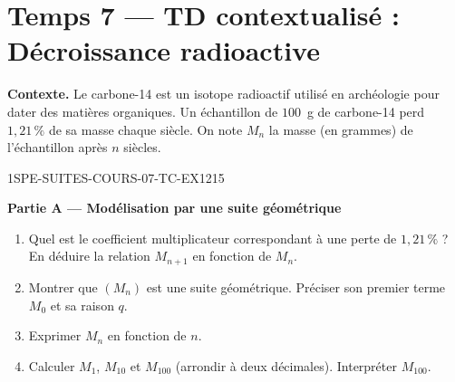 
\section*{Temps 7 — TD contextualisé : Décroissance radioactive}

\textbf{Contexte.} Le carbone-14 est un isotope radioactif utilisé en archéologie pour dater des matières organiques. Un échantillon de $100$~g de carbone-14 perd $1{,}21\,\%$ de sa masse chaque siècle. On note $M_n$ la masse (en grammes) de l'échantillon après $n$ siècles.

\bigskip


\begin{exercice}{1SPE-SUITES-COURS-07-TC-EX1}{2}{15}

\textbf{Partie A — Modélisation par une suite géométrique}

\begin{enumerate}
  \item Quel est le coefficient multiplicateur correspondant à une perte de $1{,}21\,\%$ ? En déduire la relation $M_{n+1}$ en fonction de $M_n$.
  \item Montrer que $(M_n)$ est une suite géométrique. Préciser son premier terme $M_0$ et sa raison $q$.
  \item Exprimer $M_n$ en fonction de $n$.
  \item Calculer $M_1$, $M_{10}$ et $M_{100}$ (arrondir à deux décimales). Interpréter $M_{100}$.
\end{enumerate}

\end{exercice}

